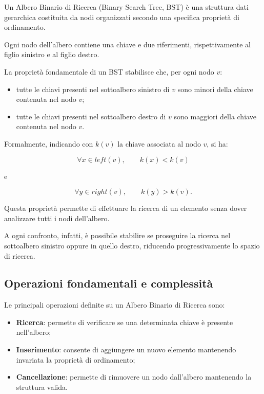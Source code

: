 \documentclass[a4paper,12pt]{article}
\begin{document}
Un Albero Binario di Ricerca (Binary Search Tree, BST) è una struttura dati gerarchica costituita da nodi organizzati secondo una specifica proprietà di ordinamento.

Ogni nodo dell'albero contiene una chiave e due riferimenti, rispettivamente al figlio sinistro e al figlio destro.

La proprietà fondamentale di un BST stabilisce che, per ogni nodo $v$:

\begin{itemize}

    \item tutte le chiavi presenti nel sottoalbero sinistro di $v$ sono minori della chiave contenuta nel nodo $v$;

    \item tutte le chiavi presenti nel sottoalbero destro di $v$ sono maggiori della chiave contenuta nel nodo $v$.

\end{itemize}

Formalmente, indicando con $k(v)$ la chiave associata al nodo $v$, si ha:

\[
\forall x \in left(v), \qquad k(x) < k(v)
\]

e

\[
\forall y \in right(v), \qquad k(y) > k(v).
\]

Questa proprietà permette di effettuare la ricerca di un elemento senza dover analizzare tutti i nodi dell'albero.

A ogni confronto, infatti, è possibile stabilire se proseguire la ricerca nel sottoalbero sinistro oppure in quello destro, riducendo progressivamente lo spazio di ricerca.

\subsection{Operazioni fondamentali e complessità}

Le principali operazioni definite su un Albero Binario di Ricerca sono:

\begin{itemize}

    \item \textbf{Ricerca}: permette di verificare se una determinata chiave è presente nell'albero;

    \item \textbf{Inserimento}: consente di aggiungere un nuovo elemento mantenendo invariata la proprietà di ordinamento;

    \item \textbf{Cancellazione}: permette di rimuovere un nodo dall'albero mantenendo la struttura valida.

\end{itemize}
\end{document}

